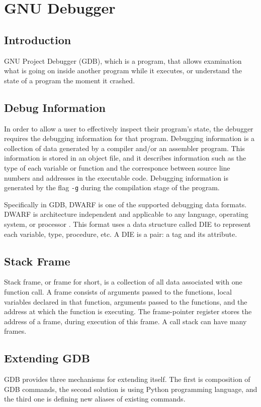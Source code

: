 \chapter{GNU Debugger} \label{GDB}
\section{Introduction}
GNU Project Debugger (GDB), which is a program, that allows examination what is going on
inside another program while it executes, or understand the state of a program
the moment it crashed\cite{reference3}.

\section{Debug Information}
In order to allow a user to effectively inspect their program's state, the
debugger requires the debugging information for that program. Debugging
information is a collection of data generated by a compiler and/or an assembler
program. This information is stored in an object file, and it describes
information such as the type of each variable or function and
the corresponce between source line numbers and addresses in the executable
code\cite{reference6}. Debugging information is generated by the flag \verb|-g| during the compilation stage of the
program.

Specifically in GDB, DWARF is one of the supported debugging data formats. DWARF is architecture
independent and applicable to any language, operating system, or processor 
\cite{reference7}. This format uses a data structure called DIE to represent
each variable, type, procedure, etc. A DIE is a pair: a tag
and its attribute\cite{reference8}.

\section{Stack Frame}
Stack frame, or frame for short, is a collection of all data associated with
one function call. A frame consists of arguments passed to the functions, local variables declared in that
function, arguments passed to the functions, and the address at which the
function is executing. The frame-pointer register stores the address of a frame,
during execution of this frame. A call stack can have many frames\cite{reference12}.

\section{Extending GDB}
GDB provides three mechanisms for extending itself. The first is
composition of GDB commands, the second solution is using Python programming
language, and the third one is defining new aliases of existing commands.

